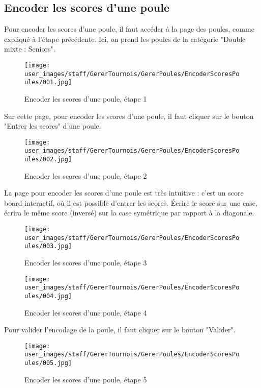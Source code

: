 \subsection{Encoder les scores d'une poule}

Pour encoder les scores d'une poule, il faut accéder à la page des poules, comme expliqué à l'étape précédente. Ici, on prend les poules de la catégorie "Double mixte : Seniors".

\begin{figure}[H]
\centering
\texttt{[image: user\_images/staff/GererTournois/GererPoules/EncoderScoresPoules/001.jpg]}
\caption{Encoder les scores d'une poule, étape 1}
\end{figure}

Sur cette page, pour encoder les scores d'une poule, il faut cliquer sur le bouton "Entrer les scores" d'une poule.

\begin{figure}[H]
\centering
\texttt{[image: user\_images/staff/GererTournois/GererPoules/EncoderScoresPoules/002.jpg]}
\caption{Encoder les scores d'une poule, étape 2}
\end{figure}

La page pour encoder les scores d'une poule est très intuitive : c'est un score board interactif, où il est possible d'entrer les scores. Écrire le score sur une case, écrira le même score (inversé) sur la case symétrique par rapport à la diagonale.

\begin{figure}[H]
\centering
\texttt{[image: user\_images/staff/GererTournois/GererPoules/EncoderScoresPoules/003.jpg]}
\caption{Encoder les scores d'une poule, étape 3}
\end{figure}

\begin{figure}[H]
\centering
\texttt{[image: user\_images/staff/GererTournois/GererPoules/EncoderScoresPoules/004.jpg]}
\caption{Encoder les scores d'une poule, étape 4}
\end{figure}

Pour valider l'encodage de la poule, il faut cliquer sur le bouton "Valider".

\begin{figure}[H]
\centering
\texttt{[image: user\_images/staff/GererTournois/GererPoules/EncoderScoresPoules/005.jpg]}
\caption{Encoder les scores d'une poule, étape 5}
\end{figure}

